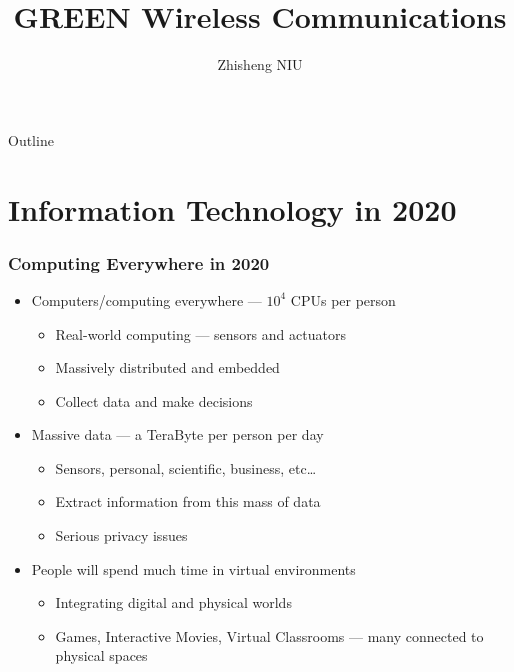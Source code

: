 \documentclass[usepdftitle=false,onlycurpagenum,secheader]{beamer}
\title
{\textcolor{green!50!black}{GREEN} \alert{Wireless Communications}}
\author[short] %
{Zhisheng NIU}
\institute[short] %
{
\niulab\\
Tsinghua University, Beijing, China
}
\date{}
\begin{document}
{
\begin{frame}[plain]
\titlepage
\end{frame}
}

\begin{frame}{Outline}
\tableofcontents
\end{frame}




\section{Information Technology in 2020}

\begin{frame}
  \frametitle{Computing Everywhere in 2020}
  \begin{itemize}
    \item Computers/computing everywhere --- $10^4$ CPUs per person
      \begin{itemize}
        \item Real-world computing --- sensors and actuators
        \item Massively distributed and embedded
        \item Collect data and make decisions
      \end{itemize}
    \item Massive data --- a TeraByte per person per day
      \begin{itemize}
        \item Sensors, personal, scientific, business, etc\ldots
        \item Extract information from this mass of data
        \item Serious privacy issues
      \end{itemize}
    \item People will spend much time in virtual environments
      \begin{itemize}
        \item Integrating digital and physical worlds
        \item Games, Interactive Movies, Virtual Classrooms --- many connected
        to physical spaces
      \end{itemize}
  \end{itemize}
\end{frame}
\end{document}
